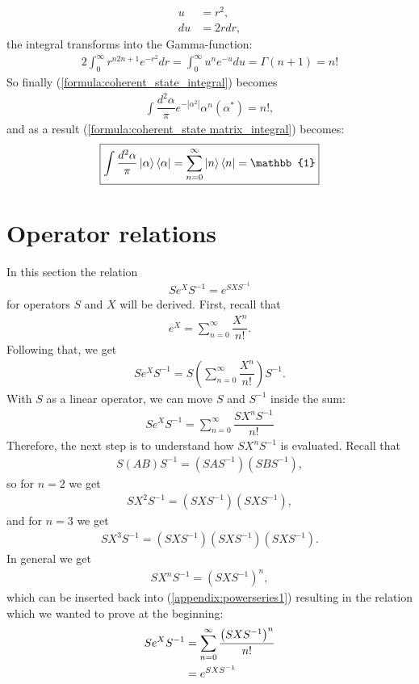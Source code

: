 \documentclass[%
 reprint,
 amsmath,amssymb,
 aps,
twocolumn
]{revtex4-2}
\begin{document}
\begin{align}
u&=r^2,\\
du&=2rdr,
\end{align}
the integral transforms into the Gamma-function:
\begin{align}
2\int_{0}^{\infty}r^{n2n+1}e^{-r^2}dr=\int_{0}^{\infty}u^ne^{-u}du=\Gamma(n+1)=n!
\end{align}
So finally (\ref{formula:coherent_state_integral}) becomes
\begin{align}
\int \dfrac{d^2\alpha}{\pi}e^{-|\alpha^2|}\alpha^n(\alpha^*)=n!,
\end{align}
and as a result (\ref{formula:coherent_state matrix_integral}) becomes:
\begin{align}\label{eq:coherent_identity}
\boxed{
\int \dfrac{d^2\alpha}{\pi}\ket{\alpha}\bra{\alpha}=\sum_{n=0}^\infty\ket{n}\bra{n}=\mathbb{1}
}
\end{align}

\section{Operator relations}
In this section the relation
\begin{align}
    Se^XS^{-1}=e^{SXS^{-1}}
\end{align}
for operators $S$ and $X$ will be derived.
First, recall that
\begin{align}
    e^X=\sum_{n=0}^\infty\dfrac{X^n}{n!}.
\end{align}
Following that, we get
\begin{align}
    Se^XS^{-1}=S\left(\sum_{n=0}^\infty\dfrac{X^n}{n!}\right)S^{-1}.
\end{align}
With $S$ as a linear operator, we can move $S$ and $S^{-1}$ inside the sum:
\begin{align}\label{appendix:powerseries1}
    Se^XS^{-1}=\sum_{n=0}^\infty\dfrac{SX^nS^{-1}}{n!}
\end{align}
Therefore, the next step is to understand how $SX^nS^{-1}$ is evaluated.
Recall that
\begin{align}
S(AB)S^{-1}=\left(SAS^{-1}\right)\left(SBS^{-1}\right),
\end{align}
so for $n=2$ we get
\begin{align}
SX^2S^{-1}=\left(SXS^{-1}\right)\left(SXS^{-1}\right),
\end{align}
and for $n=3$ we get
\begin{align}
SX^3S^{-1}=\left(SXS^{-1}\right)\left(SXS^{-1}\right)\left(SXS^{-1}\right).
\end{align}
In general we get
\begin{align}
    SX^nS^{-1}=\left(SXS^{-1}\right)^n,
\end{align}
which can be inserted back into (\ref{appendix:powerseries1}) resulting in the relation which we wanted to prove at the beginning:
\begin{align}\label{appendix:powerseries_final}
    Se^XS^{-1}&=\sum_{n=0}^\infty\dfrac{\left(SXS^{-1}\right)^n}{n!}\notag\\
              &=e^{SXS^{-1}}
\end{align}
\end{document}
